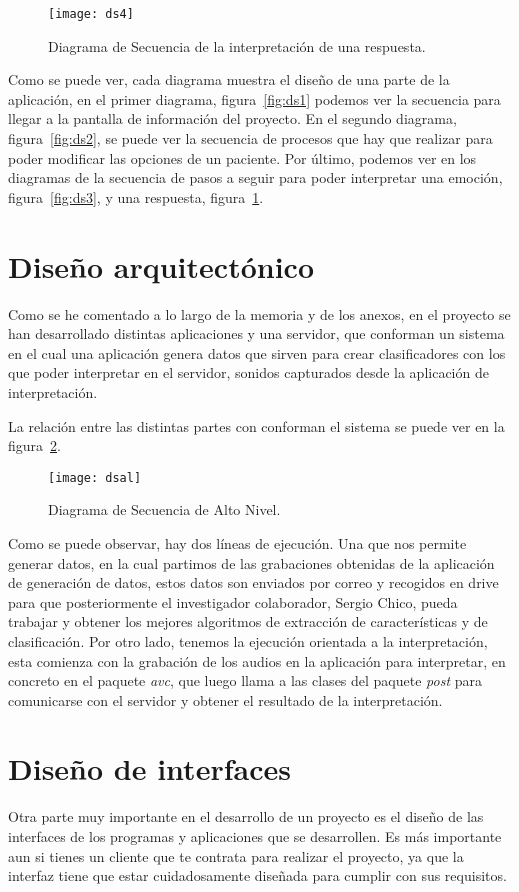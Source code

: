 \begin{figure}[H]
	\centering
	\texttt{[image: ds4]}
	\caption{Diagrama de Secuencia de la interpretación de una respuesta.}
	\label{fig:ds4}
\end{figure}

Como se puede ver, cada diagrama muestra el diseño de una parte de la aplicación, en el primer diagrama, figura~\ref{fig:ds1} podemos ver la secuencia para llegar a la pantalla de información del proyecto. En el segundo diagrama, figura~\ref{fig:ds2}, se puede ver la secuencia de procesos que hay que realizar para poder modificar las opciones de un paciente. Por último, podemos ver en los diagramas de la secuencia de pasos a seguir para poder interpretar una emoción, figura~\ref{fig:ds3}, y una respuesta, figura~\ref{fig:ds4}. 
\section{Diseño arquitectónico}

Como se he comentado a lo largo de la memoria y de los anexos, en el proyecto se han desarrollado distintas aplicaciones y una servidor, que conforman un sistema en el cual una aplicación genera datos que sirven para crear clasificadores con los que poder interpretar en el servidor, sonidos capturados desde la aplicación de interpretación.

La relación entre las distintas partes con conforman el sistema se puede ver en la figura~\ref{fig:dsal}.

\begin{figure}
	\centering
	\texttt{[image: dsal]}
	\caption{Diagrama de Secuencia de Alto Nivel.}
	\label{fig:dsal}
\end{figure}

Como se puede observar, hay dos líneas de ejecución. Una que nos permite generar datos, en la cual partimos de las grabaciones obtenidas de la aplicación de generación de datos, estos datos son enviados por correo y recogidos en drive para que posteriormente el investigador colaborador, Sergio Chico, pueda trabajar y obtener los mejores algoritmos de extracción de características y de clasificación. Por otro lado, tenemos la ejecución orientada a la interpretación, esta comienza con la grabación de los audios en la aplicación para interpretar, en concreto en el paquete \textit{avc}, que luego llama a las clases del paquete \textit{post} para comunicarse con el servidor y obtener el resultado de la interpretación.
\section{Diseño de interfaces}
Otra parte muy importante en el desarrollo de un proyecto es el diseño de las interfaces de los programas y aplicaciones que se desarrollen. Es más importante aun si tienes un cliente que te contrata para realizar el proyecto, ya que la interfaz tiene que estar cuidadosamente diseñada para cumplir con sus requisitos.
